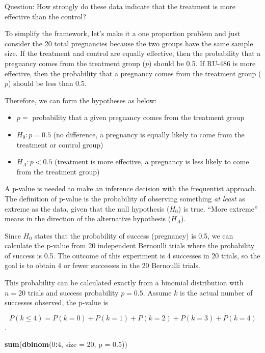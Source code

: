\documentclass[]{book}
\newenvironment{Shaded}{\begin{snugshade}}{\end{snugshade}}
\newcommand{\KeywordTok}[1]{\textcolor[rgb]{0.13,0.29,0.53}{\textbf{#1}}}
\newcommand{\DataTypeTok}[1]{\textcolor[rgb]{0.13,0.29,0.53}{#1}}
\newcommand{\DecValTok}[1]{\textcolor[rgb]{0.00,0.00,0.81}{#1}}
\newcommand{\FloatTok}[1]{\textcolor[rgb]{0.00,0.00,0.81}{#1}}
\newcommand{\OperatorTok}[1]{\textcolor[rgb]{0.81,0.36,0.00}{\textbf{#1}}}
\newcommand{\NormalTok}[1]{#1}
\theoremstyle{definition}
\theoremstyle{definition}
\theoremstyle{definition}
\theoremstyle{remark}
\begin{document}
Question: How strongly do these data indicate that the treatment is more
effective than the control?

To simplify the framework, let's make it a one proportion problem and
just consider the 20 total pregnancies because the two groups have the
same sample size. If the treatment and control are equally effective,
then the probability that a pregnancy comes from the treatment group
(\(p\)) should be 0.5. If RU-486 is more effective, then the probability
that a pregnancy comes from the treatment group (\(p\)) should be less
than 0.5.

Therefore, we can form the hypotheses as below:

\begin{itemize}
\item
  \(p =\) probability that a given pregnancy comes from the treatment
  group
\item
  \(H_0: p = 0.5\) (no difference, a pregnancy is equally likely to come
  from the treatment or control group)
\item
  \(H_A: p < 0.5\) (treatment is more effective, a pregnancy is less
  likely to come from the treatment group)
\end{itemize}

A p-value is needed to make an inference decision with the frequentist
approach. The definition of p-value is the probability of observing
something \emph{at least} as extreme as the data, given that the null
hypothesis (\(H_0\)) is true. ``More extreme'' means in the direction of
the alternative hypothesis (\(H_A\)).

Since \(H_0\) states that the probability of success (pregnancy) is 0.5,
we can calculate the p-value from 20 independent Bernoulli trials where
the probability of success is 0.5. The outcome of this experiment is 4
successes in 20 trials, so the goal is to obtain 4 or fewer successes in
the 20 Bernoulli trials.

This probability can be calculated exactly from a binomial distribution
with \(n=20\) trials and success probability \(p=0.5\). Assume \(k\) is
the actual number of successes observed, the p-value is

\[P(k \leq 4) = P(k = 0) + P(k = 1) + P(k = 2) + P(k = 3) + P(k = 4)\].

\begin{Shaded}
\begin{Highlighting}[]
\KeywordTok{sum}\NormalTok{(}\KeywordTok{dbinom}\NormalTok{(}\DecValTok{0}\OperatorTok{:}\DecValTok{4}\NormalTok{, }\DataTypeTok{size =} \DecValTok{20}\NormalTok{, }\DataTypeTok{p =} \FloatTok{0.5}\NormalTok{))}
\end{Highlighting}
\end{Shaded}
\end{document}

